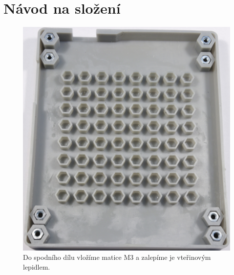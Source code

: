   \chapter{Návod na složení}
  \begin{figure}[!h]
    \begin{center}
      \includegraphics[scale=0.5]{prilohy/Krabicka_spodek_matice.jpg}
    \end{center}
    \caption[Do spodního dílu vložíme matice M3 a zalepíme je vteřinovým lepidlem]{Do spodního dílu vložíme matice M3 a zalepíme je vteřinovým lepidlem.}
  \end{figure}


